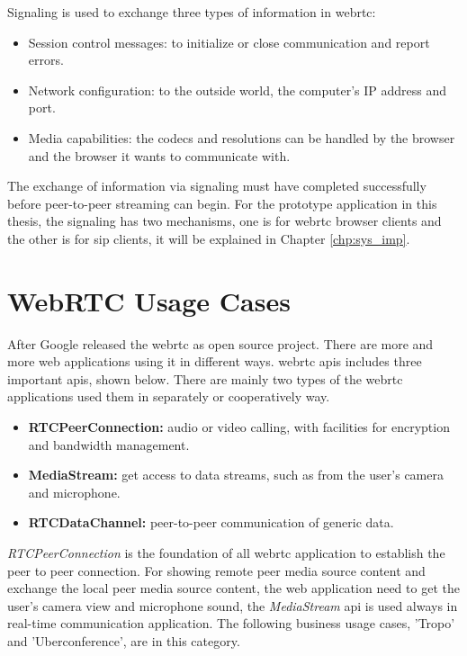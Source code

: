 \noindent Signaling is used to exchange three types of information in \gls{webrtc}\cite{html5rock:webrtc}:

\begin{itemize}[topsep=-1em,parsep=0em,itemsep=0em]
 \item Session control messages: to initialize or close communication and report errors.
 \item Network configuration: to the outside world, the computer's IP address and port.
 \item Media capabilities: the codecs and resolutions can be handled by the browser and the browser it wants to communicate with.
\end{itemize}

\par The exchange of information via signaling must have completed successfully before peer-to-peer streaming can begin. For the prototype application in this thesis, the signaling has two mechanisms, one is for \gls{webrtc} browser clients and the other is for \gls{sip} clients, it will be explained in Chapter \ref{chp:sys_imp}.

\section{WebRTC Usage Cases}

\noindent After Google released the \gls{webrtc} as open source project. There are more and more web applications using it in different ways. \gls{webrtc} \gls{api}s includes three important \gls{api}s, shown below. There are mainly two types of the \gls{webrtc} applications used them in separately or cooperatively way.

\begin{itemize}[topsep=-1em,parsep=0em,itemsep=0em]
 \item \textbf{RTCPeerConnection:} audio or video calling, with facilities for encryption and bandwidth management.
  \item \textbf{MediaStream:} get access to data streams, such as from the user's camera and microphone.
 \item \textbf{RTCDataChannel:} peer-to-peer communication of generic data.
\end{itemize}

\par \textit{RTCPeerConnection} is the foundation of all \gls{webrtc} application to establish the peer to peer connection. For showing remote peer media source content and exchange the local peer media source content, the web application need to get the user's camera view and microphone sound, the \textit{MediaStream} \gls{api} is used always in real-time communication application. The following business usage cases, 'Tropo' and 'Uberconference', are in this category.

